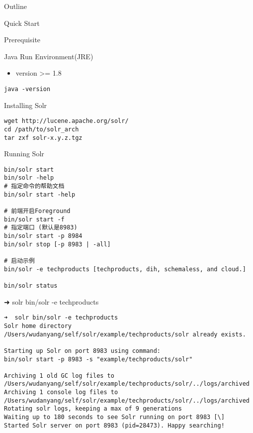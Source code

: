 \documentclass[presentation]{beamer}
\author{吴丹阳}
\date{\today}
\title{}
\begin{document}
\begin{frame}{Outline}
\tableofcontents
\end{frame}

\begin{frame}[fragile,label={sec:org3661264}]{Quick Start}
 \begin{block}{Prerequisite}
\begin{block}{Java Run Environment(JRE)}
\begin{itemize}
\item version >= 1.8
\end{itemize}
\begin{verbatim}
java -version
\end{verbatim}
\end{block}
\end{block}


\begin{block}{Installing Solr}
\begin{verbatim}
wget http://lucene.apache.org/solr/
cd /path/to/solr_arch
tar zxf solr-x.y.z.tgz
\end{verbatim}
\end{block}


\begin{block}{Running Solr}
\begin{verbatim}
bin/solr start
bin/solr -help
# 指定命令的帮助文档
bin/solr start -help

# 前端开启Foreground
bin/solr start -f
# 指定端口 (默认是8983)
bin/solr start -p 8984
bin/solr stop [-p 8983 | -all]

# 启动示例
bin/solr -e techproducts [techproducts, dih, schemaless, and cloud.]

bin/solr status
\end{verbatim}

➜  solr bin/solr -e techproducts
\begin{verbatim}
➜  solr bin/solr -e techproducts
Solr home directory /Users/wudanyang/self/solr/example/techproducts/solr already exists.

Starting up Solr on port 8983 using command:
bin/solr start -p 8983 -s "example/techproducts/solr"

Archiving 1 old GC log files to /Users/wudanyang/self/solr/example/techproducts/solr/../logs/archived
Archiving 1 console log files to /Users/wudanyang/self/solr/example/techproducts/solr/../logs/archived
Rotating solr logs, keeping a max of 9 generations
Waiting up to 180 seconds to see Solr running on port 8983 [\]
Started Solr server on port 8983 (pid=28473). Happy searching!



\end{verbatim}
\end{block}
\end{frame}
\end{document}
